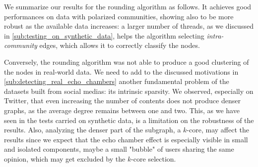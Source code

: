\bigskip

We summarize our results for the rounding algorithm as follows. It achieves good performances on data with
polarized communities, showing also to be more robust as the
available data increases: a larger number of threads, as we discussed
in \autoref{sub:testing_on_synthetic_data}, helps the algorithm selecting
\emph{intra-community} edges, which allows it to correctly classify the nodes.

Conversely, the rounding algorithm was not able to produce a good clustering of the
nodes in real-world data. We need to add to the discussed motivations in
\autoref{sub:detecting_real_echo_chambers} another fundamental problem of the
datasets built from social medias: its intrinsic sparsity. We observed,
especially on Twitter, that even increasing the number of contents
does not produce denser graphs, as the average degree remains between one and
two. This, as we have seen in the tests carried on synthetic data, is a limitation
on the robustness of the results. Also, analyzing the denser part of the
subgraph, a $k$-core, may affect the results since we expect that the echo chamber
effect is especially visible in small and isolated components, maybe a small
"bubble" of users sharing the same opinion, which may get excluded by
the $k$-core selection.
